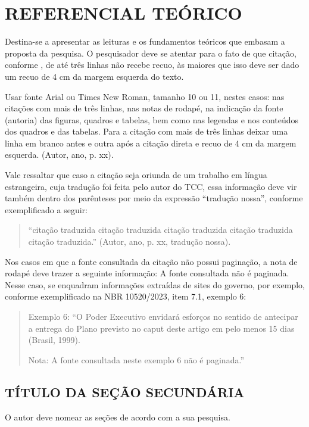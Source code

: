 \section{REFERENCIAL TEÓRICO}
Destina-se a apresentar as leituras e os fundamentos teóricos que embasam a proposta da pesquisa. O pesquisador deve se atentar para o fato de que citação, conforme \textcite{abnt10520}, de até três linhas não recebe recuo, às maiores que isso deve ser dado um recuo de 4 cm da margem esquerda do texto.

Usar fonte Arial ou Times New Roman, tamanho 10 ou 11, nestes casos: nas citações com mais de três linhas, nas notas de rodapé, na indicação da fonte (autoria) das figuras, quadros e tabelas, bem como nas legendas e nos conteúdos dos quadros e das tabelas. Para a citação com mais de três linhas deixar uma linha em branco antes e outra após a citação direta e recuo de 4 cm da margem esquerda. (Autor, ano, p. xx).

Vale ressaltar que caso a citação seja oriunda de um trabalho em língua estrangeira, cuja tradução foi feita pelo autor do TCC, essa informação deve vir também dentro dos parênteses por meio da expressão “tradução nossa”, conforme exemplificado a seguir:

\begin{quote}
    “citação traduzida citação traduzida citação traduzida citação traduzida citação traduzida.” (Autor, ano, p. xx, tradução nossa).
\end{quote}

Nos casos em que a fonte consultada da citação não possui paginação, a nota de rodapé deve trazer a seguinte informação: A fonte consultada não é paginada. Nesse caso, se enquadram informações extraídas de sites do governo, por exemplo, conforme exemplificado na NBR 10520/2023, item 7.1, exemplo 6:

\begin{quote}
    Exemplo 6: “O Poder Executivo envidará esforços no sentido de antecipar a entrega do Plano previsto no caput deste artigo em pelo menos 15 dias (Brasil, 1999).
    
    Nota: A fonte consultada neste exemplo 6 não é paginada.”
\end{quote}

\subsection{TÍTULO DA SEÇÃO SECUNDÁRIA}
O autor deve nomear as seções de acordo com a sua pesquisa.

